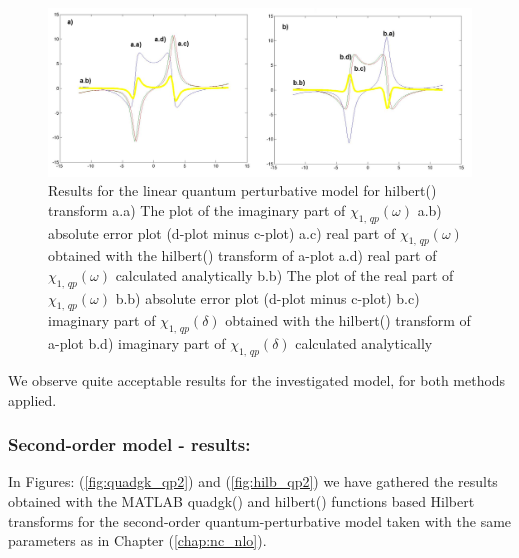 \documentclass[12pt,twoside,a4paper]{article}
\numberwithin{equation}{subsection}
\numberwithin{figure}{subsection}
\begin{document}
\begin{figure}
  \includegraphics[width=150mm]{img/hilb_qp1.png}
  \caption{Results for the linear quantum perturbative model for hilbert() transform
    a.a) The plot of the imaginary part of ${\chi_{1, \, qp}}(\omega )$
    a.b) absolute error plot (d-plot minus c-plot) 
    a.c) real part of ${\chi_{1, \, qp}}(\omega )$ obtained with the hilbert()  transform of a-plot 
    a.d) real part of ${\chi_{1, \, qp}}(\omega )$ calculated analytically 
    b.b) The plot of the real part of ${\chi_{1, \, qp}}(\omega )$ 
    b.b) absolute error plot (d-plot minus c-plot) 
    b.c) imaginary part of ${\chi_{1, \, qp}}(\delta )$ obtained with the hilbert()  transform of a-plot 
    b.d) imaginary part of ${\chi_{1, \, qp}}(\delta )$ calculated analytically  
    \label{fig:hilb_qp1}
  }
\end{figure}

We observe quite acceptable results for the investigated model, for both methods applied. 

\subsubsection*{Second-order model - results:}

In Figures: (\ref{fig:quadgk_qp2}) and (\ref{fig:hilb_qp2}) we have ga\-thered the results ob\-tained with the MATLAB quadgk() and
hilbert() func\-tions based Hil\-bert transforms for the se\-cond\--order quan\-tum\--per\-tur\-bative model taken with the same
para\-meters as in Chapter (\ref{chap:nc_nlo}).
\end{document}
